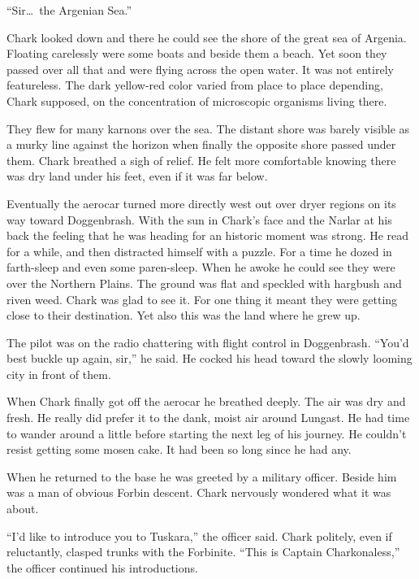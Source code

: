 ``Sir\ldots\ the Argenian Sea.''

Chark looked down and there he could see the shore of the great sea of Argenia. Floating
carelessly were some boats and beside them a beach. Yet soon they passed over all that and were
flying across the open water. It was not entirely featureless. The dark yellow-red color varied
from place to place depending, Chark supposed, on the concentration of microscopic organisms
living there.

They flew for many karnons over the sea. The distant shore was barely visible as a murky line
against the horizon when finally the opposite shore passed under them. Chark breathed a sigh of
relief. He felt more comfortable knowing there was dry land under his feet, even if it was far
below.

Eventually the aerocar turned more directly west out over dryer regions on its way toward
Doggenbrash. With the sun in Chark's face and the Narlar at his back the feeling that he was
heading for an historic moment was strong. He read for a while, and then distracted himself with
a puzzle. For a time he dozed in farth-sleep and even some paren-sleep. When he awoke he could
see they were over the Northern Plains. The ground was flat and speckled with hargbush and riven
weed. Chark was glad to see it. For one thing it meant they were getting close to their
destination. Yet also this was the land where he grew up.

The pilot was on the radio chattering with flight control in Doggenbrash. ``You'd best buckle up
again, sir,'' he said. He cocked his head toward the slowly looming city in front of them.

When Chark finally got off the aerocar he breathed deeply. The air was dry and fresh. He really
did prefer it to the dank, moist air around Lungast. He had time to wander around a little
before starting the next leg of his journey. He couldn't resist getting some mosen cake. It had
been so long since he had any.


When he returned to the base he was greeted by a military officer. Beside him was a man of
obvious Forbin descent. Chark nervously wondered what it was about.


``I'd like to introduce you to Tuskara,'' the officer said. Chark politely, even if reluctantly,
clasped trunks with the Forbinite. ``This is Captain Charkonaless,'' the officer continued his
introductions.

